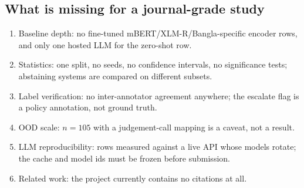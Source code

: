 \documentclass[11pt]{article}
\begin{document}
\subsection{What is missing for a journal-grade study}
\begin{enumerate}[label=\arabic*.,leftmargin=*]
      \item Baseline depth: no fine-tuned mBERT/XLM-R/Bangla-specific encoder
      rows, and only one hosted LLM for the zero-shot row.
      \item Statistics: one split, no seeds, no confidence intervals, no
      significance tests; abstaining systems are compared on different subsets.
      \item Label verification: no inter-annotator agreement anywhere; the
      escalate flag is a policy annotation, not ground truth.
      \item OOD scale: $n=105$ with a judgement-call mapping is a caveat, not
      a result.
      \item LLM reproducibility: rows measured against a live API whose models
      rotate; the cache and model ids must be frozen before submission.
      \item Related work: the project currently contains no citations at all.
\end{enumerate}
\end{document}

